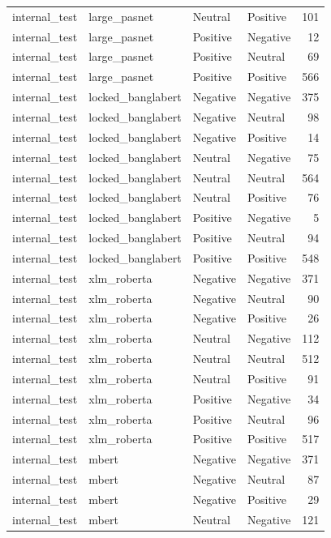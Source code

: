 \begin{tabular}{llllr}
internal\_test & large\_pasnet & Neutral & Positive & 101 \\
internal\_test & large\_pasnet & Positive & Negative & 12 \\
internal\_test & large\_pasnet & Positive & Neutral & 69 \\
internal\_test & large\_pasnet & Positive & Positive & 566 \\
internal\_test & locked\_banglabert & Negative & Negative & 375 \\
internal\_test & locked\_banglabert & Negative & Neutral & 98 \\
internal\_test & locked\_banglabert & Negative & Positive & 14 \\
internal\_test & locked\_banglabert & Neutral & Negative & 75 \\
internal\_test & locked\_banglabert & Neutral & Neutral & 564 \\
internal\_test & locked\_banglabert & Neutral & Positive & 76 \\
internal\_test & locked\_banglabert & Positive & Negative & 5 \\
internal\_test & locked\_banglabert & Positive & Neutral & 94 \\
internal\_test & locked\_banglabert & Positive & Positive & 548 \\
internal\_test & xlm\_roberta & Negative & Negative & 371 \\
internal\_test & xlm\_roberta & Negative & Neutral & 90 \\
internal\_test & xlm\_roberta & Negative & Positive & 26 \\
internal\_test & xlm\_roberta & Neutral & Negative & 112 \\
internal\_test & xlm\_roberta & Neutral & Neutral & 512 \\
internal\_test & xlm\_roberta & Neutral & Positive & 91 \\
internal\_test & xlm\_roberta & Positive & Negative & 34 \\
internal\_test & xlm\_roberta & Positive & Neutral & 96 \\
internal\_test & xlm\_roberta & Positive & Positive & 517 \\
internal\_test & mbert & Negative & Negative & 371 \\
internal\_test & mbert & Negative & Neutral & 87 \\
internal\_test & mbert & Negative & Positive & 29 \\
internal\_test & mbert & Neutral & Negative & 121 \\

\end{tabular}
